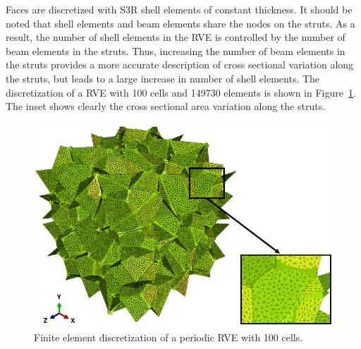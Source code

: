 \documentclass[review]{elsarticle}
\begin{document}
Faces are discretized with S3R shell elements of constant thickness. It should be noted that shell elements and beam elements share the nodes on the struts. As a result, the number of shell elements in the RVE is controlled by the number of beam elements in the struts. Thus, increasing the number of beam elements in the struts provides a more accurate description of cross sectional variation along the struts, but leads to a large increase in number of shell elements. The discretization of a RVE with 100 cells and 149730 elements 
is shown in Figure~\ref{fig:Discretized}. The inset shows clearly the cross sectional area variation along the struts.
\begin{figure}[hb]
  \centering
  \includegraphics[scale=0.6]{Discretized}
  \captionsetup{justification=centering}
  \caption[Close up of \textit{Hemidactylus} sp.]
   {Finite element discretization of a periodic RVE with 100 cells.}
   \label{fig:Discretized}
\end{figure}
\end{document}
